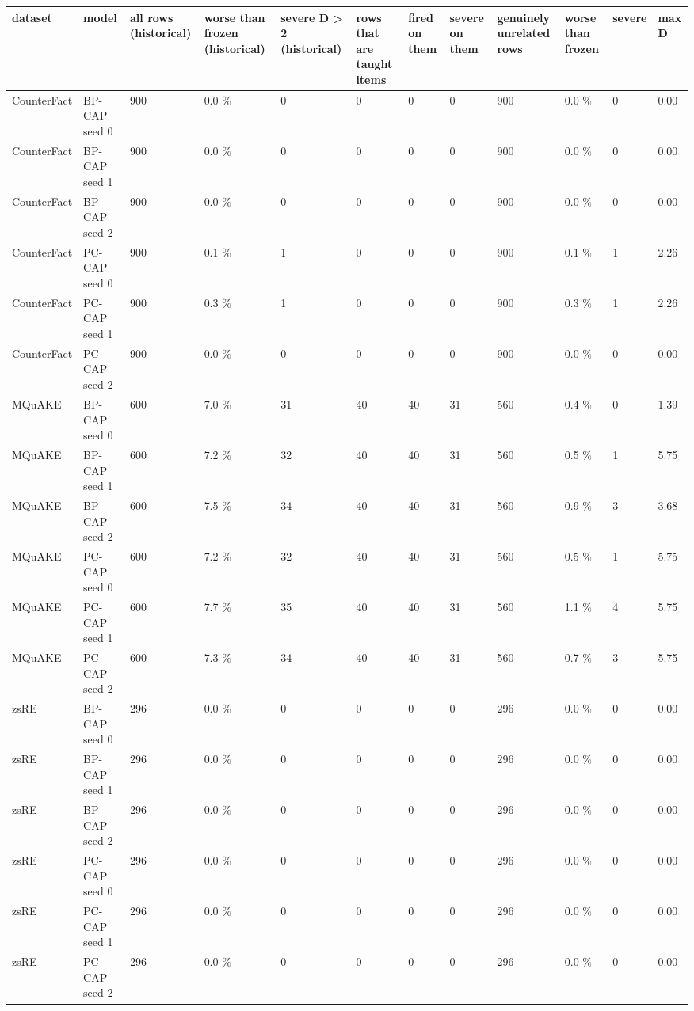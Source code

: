\documentclass[10pt,a4paper]{article}
\begin{document}
\begin{center}\tiny
\begin{tabularx}{\textwidth}{@{}p{}XXXXXXXXXXX@{}}
\toprule
dataset & model & all rows (historical) & worse than frozen (historical) & severe D > 2 (historical) & rows that are taught items & fired on them & severe on them & genuinely unrelated rows & worse than frozen & severe & max D \\ \midrule
CounterFact & BP-CAP seed 0 & 900 & 0.0 \% & 0 & 0 & 0 & 0 & 900 & 0.0 \% & 0 & 0.00 \\
CounterFact & BP-CAP seed 1 & 900 & 0.0 \% & 0 & 0 & 0 & 0 & 900 & 0.0 \% & 0 & 0.00 \\
CounterFact & BP-CAP seed 2 & 900 & 0.0 \% & 0 & 0 & 0 & 0 & 900 & 0.0 \% & 0 & 0.00 \\
CounterFact & PC-CAP seed 0 & 900 & 0.1 \% & 1 & 0 & 0 & 0 & 900 & 0.1 \% & 1 & 2.26 \\
CounterFact & PC-CAP seed 1 & 900 & 0.3 \% & 1 & 0 & 0 & 0 & 900 & 0.3 \% & 1 & 2.26 \\
CounterFact & PC-CAP seed 2 & 900 & 0.0 \% & 0 & 0 & 0 & 0 & 900 & 0.0 \% & 0 & 0.00 \\
MQuAKE & BP-CAP seed 0 & 600 & 7.0 \% & 31 & 40 & 40 & 31 & 560 & 0.4 \% & 0 & 1.39 \\
MQuAKE & BP-CAP seed 1 & 600 & 7.2 \% & 32 & 40 & 40 & 31 & 560 & 0.5 \% & 1 & 5.75 \\
MQuAKE & BP-CAP seed 2 & 600 & 7.5 \% & 34 & 40 & 40 & 31 & 560 & 0.9 \% & 3 & 3.68 \\
MQuAKE & PC-CAP seed 0 & 600 & 7.2 \% & 32 & 40 & 40 & 31 & 560 & 0.5 \% & 1 & 5.75 \\
MQuAKE & PC-CAP seed 1 & 600 & 7.7 \% & 35 & 40 & 40 & 31 & 560 & 1.1 \% & 4 & 5.75 \\
MQuAKE & PC-CAP seed 2 & 600 & 7.3 \% & 34 & 40 & 40 & 31 & 560 & 0.7 \% & 3 & 5.75 \\
zsRE & BP-CAP seed 0 & 296 & 0.0 \% & 0 & 0 & 0 & 0 & 296 & 0.0 \% & 0 & 0.00 \\
zsRE & BP-CAP seed 1 & 296 & 0.0 \% & 0 & 0 & 0 & 0 & 296 & 0.0 \% & 0 & 0.00 \\
zsRE & BP-CAP seed 2 & 296 & 0.0 \% & 0 & 0 & 0 & 0 & 296 & 0.0 \% & 0 & 0.00 \\
zsRE & PC-CAP seed 0 & 296 & 0.0 \% & 0 & 0 & 0 & 0 & 296 & 0.0 \% & 0 & 0.00 \\
zsRE & PC-CAP seed 1 & 296 & 0.0 \% & 0 & 0 & 0 & 0 & 296 & 0.0 \% & 0 & 0.00 \\
zsRE & PC-CAP seed 2 & 296 & 0.0 \% & 0 & 0 & 0 & 0 & 296 & 0.0 \% & 0 & 0.00 \\
\bottomrule
\end{tabularx}
\end{center}
\end{document}
